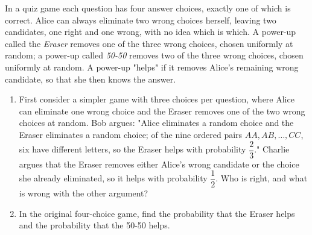 In a quiz game each question has four answer choices, exactly one of which is correct. Alice can always eliminate two wrong choices herself, leaving two candidates, one right and one wrong, with no idea which is which. A power-up called the \emph{Eraser} removes one of the three wrong choices, chosen uniformly at random; a power-up called \emph{50-50} removes two of the three wrong choices, chosen uniformly at random. A power-up "helps" if it removes Alice's remaining wrong candidate, so that she then knows the answer.
\begin{enumerate}
\item First consider a simpler game with three choices per question, where Alice can eliminate one wrong choice and the Eraser removes one of the two wrong choices at random. Bob argues: "Alice eliminates a random choice and the Eraser eliminates a random choice; of the nine ordered pairs $AA,AB,\dots,CC$, six have different letters, so the Eraser helps with probability $\dfrac{2}{3}$." Charlie argues that the Eraser removes either Alice's wrong candidate or the choice she already eliminated, so it helps with probability $\dfrac{1}{2}$. Who is right, and what is wrong with the other argument?
\item In the original four-choice game, find the probability that the Eraser helps and the probability that the 50-50 helps.
\end{enumerate}
